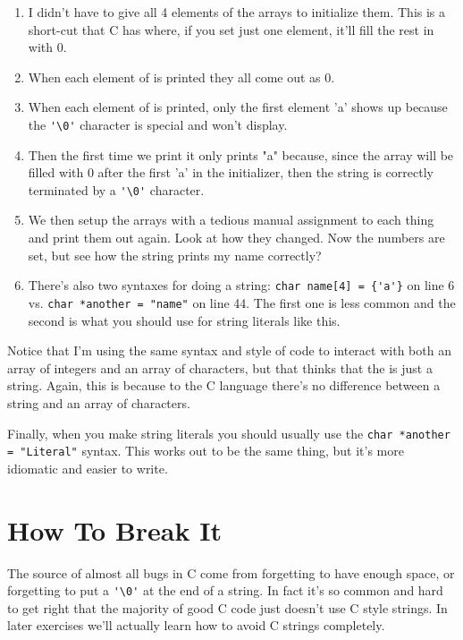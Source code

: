 \begin{enumerate}
\item I didn't have to give all 4 elements of the arrays to initialize them.
    This is a short-cut that C has where, if you set just one element, it'll
    fill the rest in with 0.
\item When each element of  is printed they all come out as
    0.
\item When each element of  is printed, only the first element 'a'
    shows up because the \verb|'\0'| character is special and won't display.
\item Then the first time we print  it only prints "a" because,
    since the array will be filled with 0 after the first 'a' in the 
    initializer, then the string is correctly terminated by a \verb|'\0'|
    character.
\item We then setup the arrays with a tedious manual assignment to each thing
    and print them out again.  Look at how they changed.  Now the numbers
    are set, but see how the  string prints my name correctly?

\item There's also two syntaxes for doing a string:
    \verb|char name[4] = {'a'}| on line 6
    vs. \verb|char *another = "name"| on line 44.  The first 
    one is less common and the second is what you should use
    for string literals like this.

\end{enumerate}

Notice that I'm using the same syntax and style of code to interact with both
an array of integers and an array of characters, but that 
thinks that the  is just a string.  Again, this is because to the
C language there's no difference between a string and an array of characters.

Finally, when you make string literals you should usually use the
\verb|char *another = "Literal"| syntax.  This works out to be the same thing, 
but it's more idiomatic and easier to write.


\section{How To Break It}

The source of almost all bugs in C come from forgetting to have enough
space, or forgetting to put a \verb|'\0'| at the end of a string.  In
fact it's so common and hard to get right that the majority of good C
code just doesn't use C style strings.  In later exercises we'll actually
learn how to avoid C strings completely.

